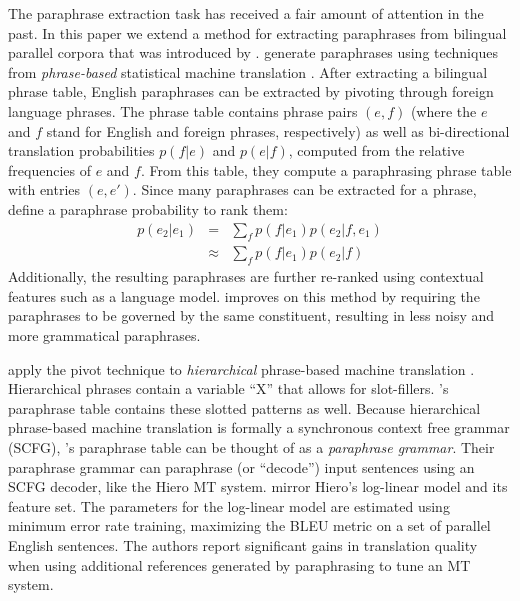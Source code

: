 \documentclass[11pt]{article}
\DeclareMathOperator*{\argmax}{arg\,max}
\begin{document}
The paraphrase extraction task has received a fair amount of attention
in the past.  In this paper we extend a method for extracting paraphrases from bilingual parallel corpora 
that was introduced by .  generate paraphrases using techniques from {\it phrase-based} statistical machine translation \cite{Koehn2003}.    After extracting a bilingual phrase table, English paraphrases can be extracted by pivoting through foreign language phrases. The phrase table
contains phrase pairs $(e, f)$ (where the $e$ and $f$ stand for
English and foreign phrases, respectively) as well as bi-directional
translation probabilities $p(f | e)$ and $p(e | f)$, computed from the
relative frequencies of $e$ and $f$. From this table, they compute a
paraphrasing phrase table with entries $(e, e')$.   Since many paraphrases can be extracted for a phrase,  define  a paraphrase probability to rank them:
\begin{eqnarray}
p(e_2|e_1) 	&=&			\sum_f p(f|e_1) p(e_2|f,e_1)\\
			&\approx& 	\sum_f p(f|e_1) p(e_2|f)
\label{paraphrase-prob-eqn}
\end{eqnarray}
Additionally, the resulting paraphrases are further re-ranked using
contextual features such as a language
model.  improves on this method by
requiring the paraphrases to be governed by the same constituent,
resulting in less noisy and more grammatical paraphrases.

 apply the pivot technique to {\it hierarchical} phrase-based machine translation \cite{Chiang2005}.  Hierarchical phrases contain a variable ``X'' that allows for slot-fillers.  's paraphrase table contains these slotted patterns as well.  Because hierarchical phrase-based machine translation is formally a synchronous context free grammar (SCFG), 's paraphrase table can be thought of as a {\it paraphrase grammar}.   Their paraphrase grammar can paraphrase (or ``decode'') input sentences using an SCFG decoder, like the Hiero MT
system.    mirror Hiero's log-linear model and its feature set.  The parameters for the log-linear model are estimated using
minimum error rate training, maximizing the BLEU metric on a set of
parallel English sentences. The authors report significant gains in
translation quality when using additional references generated by
paraphrasing to tune an MT system.
\end{document}
